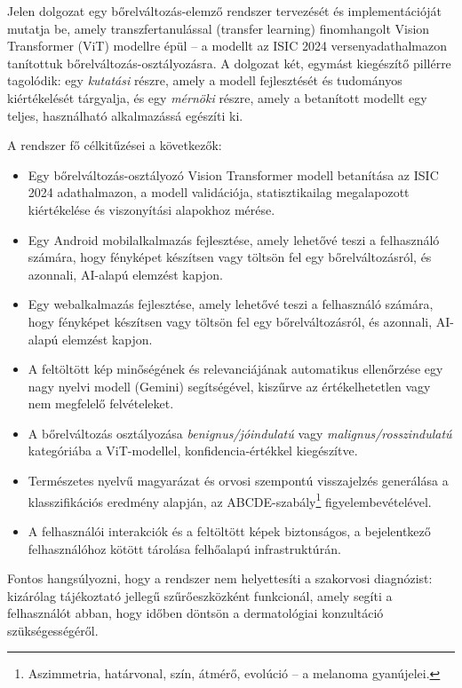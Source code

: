 Jelen dolgozat egy bőrelváltozás-elemző
rendszer tervezését és implementációját mutatja be, amely transzfertanulással (transfer learning) 
finomhangolt Vision Transformer (ViT)
\cite{dosovitskiy2021vit} modellre épül -- a modellt az ISIC 2024
versenyadathalmazon \cite{isic2024} tanítottuk bőrelváltozás-osztályozásra. A
dolgozat két, egymást kiegészítő pillérre tagolódik: egy \emph{kutatási} részre,
amely a modell fejlesztését és tudományos kiértékelését tárgyalja, és egy
\emph{mérnöki} részre, amely a betanított modellt egy teljes, használható
alkalmazássá egészíti ki.

A rendszer fő célkitűzései a következők:

\begin{itemize}
    \item Egy bőrelváltozás-osztályozó Vision Transformer modell betanítása az
    ISIC 2024 adathalmazon, a modell validációja, statisztikailag megalapozott
    kiértékelése és viszonyítási alapokhoz mérése.
    \item Egy Android mobilalkalmazás fejlesztése, amely lehetővé teszi a
    felhasználó számára, hogy fényképet készítsen vagy töltsön fel egy
    bőrelváltozásról, és azonnali, AI-alapú elemzést kapjon.
    \item Egy webalkalmazás fejlesztése, amely lehetővé teszi a
    felhasználó számára, hogy fényképet készítsen vagy töltsön fel egy
    bőrelváltozásról, és azonnali, AI-alapú elemzést kapjon.
    \item A feltöltött kép minőségének és relevanciájának automatikus
    ellenőrzése egy nagy nyelvi modell (Gemini) segítségével, kiszűrve az
    értékelhetetlen vagy nem megfelelő felvételeket.
    \item A bőrelváltozás osztályozása \textit{benignus/jóindulatú} vagy \textit{malignus/rosszindulatú}
    kategóriába a ViT-modellel, konfidencia-értékkel kiegészítve.
    \item Természetes nyelvű magyarázat és orvosi szempontú visszajelzés
    generálása a klasszifikációs eredmény alapján, az ABCDE-szabály\footnote{Aszimmetria, határvonal, szín, átmérő, evolúció -- a melanoma
    gyanújelei.} figyelembevételével.
    \item A felhasználói interakciók és a feltöltött képek biztonságos, a
    bejelentkező felhasználóhoz kötött tárolása felhőalapú infrastruktúrán.
\end{itemize}

Fontos hangsúlyozni, hogy a rendszer nem helyettesíti a szakorvosi diagnózist:
kizárólag tájékoztató jellegű szűrőeszközként funkcionál, amely segíti a
felhasználót abban, hogy időben döntsön a dermatológiai konzultáció
szükségességéről.

